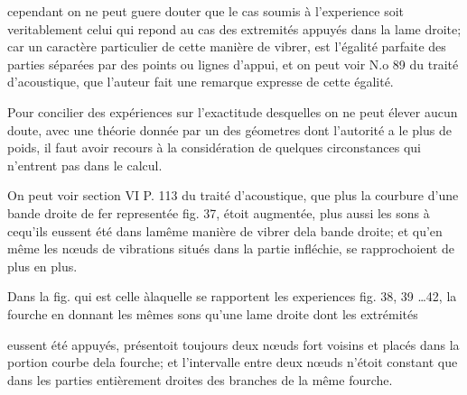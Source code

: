 \documentclass[11pt,a4paper]{article}
\begin{document}
cependant on ne peut guere douter que le cas soumis à l'experience
 soit veritablement celui qui repond au cas des extremités
appuyés dans la lame droite; car un caractère particulier
de cette manière de vibrer, est l'égalité parfaite des parties
séparées par des points ou lignes d'appui, et on
peut voir N.o 89 du traité d'acoustique, que l'auteur fait
une remarque expresse de cette égalité.

Pour concilier des expériences sur l'exactitude desquelles
on ne peut élever aucun doute, avec une théorie donnée
par un des géometres dont l'autorité a le plus de poids,
il faut avoir recours à la considération de quelques
circonstances  qui n'entrent pas dans le calcul.

On peut voir section VI P. 113 du traité d'acoustique,
 que plus la courbure
d'une bande droite de fer  representée
fig. 37, étoit augmentée, plus aussi les sons   à
cequ'ils eussent été dans lamême manière de vibrer
dela bande droite;  et qu'en même
 les nœuds de vibrations situés dans la partie
infléchie, se rapprochoient de plus en plus.

Dans la fig.  qui est celle àlaquelle se rapportent
les experiences fig. 38, 39 \ldots 42, la fourche en donnant
les mêmes sons qu'une lame droite dont les extrémités


eussent été appuyés, présentoit toujours deux nœuds fort voisins
et placés dans la portion courbe dela fourche;  et l'intervalle entre deux nœuds
n'étoit constant que dans les parties entièrement droites des
branches de la même fourche.
\end{document}
